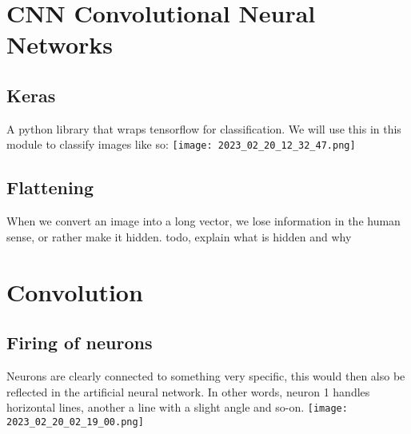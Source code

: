 \documentclass[main.tex,fontsize=8pt,paper=a4,paper=portrait,DIV=calc,]{scrartcl}
\begin{document}
\tableofcontents

\lstset{
    language=Python,
    style=code,
}

\newcommand{\TITLE}{AI Applications}
\newcommand{\AUTHOR}{Fabio Lenherr}
\setcounter{tocdepth}{1}

\section{CNN Convolutional Neural Networks}

\subsection{Keras}
A python library that wraps tensorflow for classification.\newline
We will use this in this module to classify images like so:\newline
\texttt{[image: 2023\_02\_20\_12\_32\_47.png]}

\subsection{Flattening}
When we convert an image into a long vector, we lose information in the human sense, or rather make it hidden.\newline
todo, explain what is hidden and why


\section{Convolution}
\subsection{Firing of neurons}
Neurons are clearly connected to something very specific, this would then also be reflected in the artificial neural network. In other words, neuron 1 handles horizontal lines, another a line with a slight angle and so-on.\newline
\texttt{[image: 2023\_02\_20\_02\_19\_00.png]}
\end{document}
